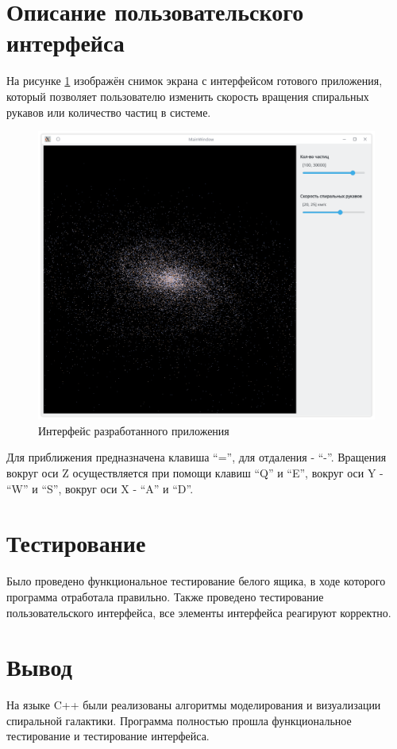 \section{Описание пользовательского интерфейса}
На рисунке \ref{img:gui01} изображён снимок экрана с интерфейсом готового приложения, который позволяет пользователю изменить скорость вращения спиральных рукавов или количество частиц в системе.
\begin{figure}[H]
    \centering
    \includegraphics[scale=0.5]{image/gui01.png}
    \caption{Интерфейс разработанного приложения}
    \label{img:gui01}
\end{figure}

Для приближения предназначена клавиша ``='', для отдаления - ``-''. Вращения вокруг оси Z осуществляется при помощи клавиш ``Q'' и ``E'', вокруг оси Y - ``W'' и ``S'', вокруг оси X - ``A'' и ``D''.

\section{Тестирование}
Было проведено функциональное тестирование белого ящика, в ходе которого программа отработала правильно. Также проведено тестирование пользовательского интерфейса, все элементы интерфейса реагируют корректно.

\section{Вывод}
На языке C++ были реализованы алгоритмы моделирования и визуализации спиральной галактики. Программа полностью прошла функциональное тестирование и тестирование интерфейса.

